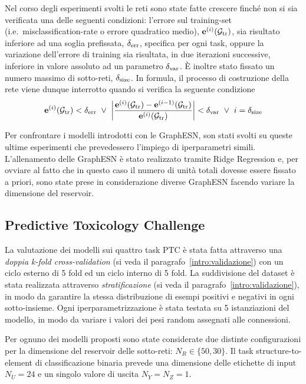 Nel corso degli esperimenti svolti le reti sono state fatte crescere finché non si sia verificata una delle seguenti condizioni: l'errore sul training-set (i.e.\ misclassification-rate o errore quadratico medio), $\mathbf{e}^{(i)}(\mathcal{G}_\textup{tr})$, sia risultato inferiore ad una soglia prefissata, $\delta_\textup{err}$, specifica per ogni task, oppure la variazione dell'errore di training sia risultata, in due iterazioni successive, inferiore in valore assoluto ad un parametro $\delta_\textup{var}$. \`E inoltre stato fissato un numero massimo di sotto-reti, $\delta_\textup{size}$. In formula, il processo di costruzione della rete viene dunque interrotto quando si verifica la seguente condizione
\[
\mathbf{e}^{(i)}(\mathcal{G}_\textup{tr}) < \delta_\textup{err}
\ \vee\
\left\lvert \dfrac{\mathbf{e}^{(i)}(\mathcal{G}_\textup{tr}) - \mathbf{e}^{(i-1)}(\mathcal{G}_\textup{tr})}{\mathbf{e}^{(i)}(\mathcal{G}_\textup{tr})} \right\rvert < \delta_\textup{var}
\ \vee\
i = \delta_\textup{size}
\]

Per confrontare i modelli introdotti con le GraphESN, son stati svolti su queste ultime esperimenti che prevedessero l'impiego di iperparametri simili. L'allenamento delle GraphESN è stato realizzato tramite Ridge Regression e, per ovviare al fatto che in questo caso il numero di unità totali dovesse essere fissato a priori, sono state prese in considerazione diverse GraphESN facendo variare la dimensione del reservoir. 



\subsection{Predictive Toxicology Challenge}
La valutazione dei modelli sui quattro task PTC è stata fatta attraverso una \emph{doppia k-fold cross-validation} (si veda il paragrafo~\ref{intro:validazione}) con un ciclo esterno di 5 fold ed un ciclo interno di 5 fold. La suddivisione del dataset è stata realizzata attraverso \emph{stratificazione} (si veda il paragrafo~\ref{intro:validazione}), in modo da garantire la stessa distribuzione di esempi positivi e negativi in ogni sotto-insieme.
Ogni iperparametrizzazione è stata testata su 5 istanziazioni del modello, in modo da variare i valori dei pesi random assegnati alle connessioni. 

Per ognuno dei modelli proposti sono state considerate due distinte configurazioni per la dimensione del reservoir delle sotto-reti: $N_R \in \lbrace 50, 30 \rbrace$. Il task structure-to-element di classificazione binaria prevede una dimensione delle etichette di input $N_U = 24$ e un singolo valore di uscita $N_Y = N_Z = 1$.

